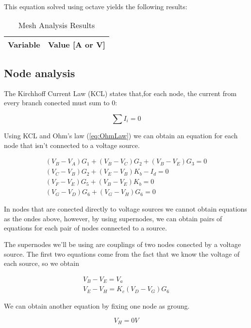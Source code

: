 This equation solved using octave yields the following results:

\begin{table}[H]
    \centering
    \begin{tabular}{|l|r|}
      \hline    
      {\bf Variable} & {\bf Value [A or V]} \\ \hline
      
    \end{tabular}
    \caption{Mesh Analysis Results}
    \label{tab:meshA}
  \end{table}

\subsection{Node analysis}
The Kirchhoff Current Law (KCL) states that,for each node, the current from every branch conected must sum to 0:

\begin{equation}
  \sum I_i = 0
  \label{eq:KCL}
\end{equation}


Using KCL and Ohm's law (\ref{eq:OhmLaw}) we can obtain an equation for each node that isn't connected to a voltage source.

\begin{align}
  (V_B-V_A)G_1+(V_B-V_C)G_2+(V_B-V_E)G_3=0\\
  (V_C-V_B)G_2+(V_E-V_B)K_b-I_d=0\\
  (V_F-V_E)G_5+(V_B-V_E)K_b=0\\
  (V_G-V_D)G_6+(V_G-V_H)G_6=0
  \label{eq:nodos}
\end{align}


In nodes that are conected directly to voltage sources we cannot obtain equations as the ondes above, however, by using supernodes, we can obtain pairs of equations for each pair of nodes connected to a source.
\par
The supernodes we'll be using are couplings of two nodes conected by a voltage source. The first two equations come from the fact that we know the voltage of each source, so we obtain

 \begin{align}
  V_B-V_E=V_a\\
  V_E-V_H=K_c(V_D-V_G)G_6
  \label{eq:supenodosV}
\end{align}

We can obtain another equation by fixing one node as groung.

 \begin{equation}
  V_H = 0V
  \label{eq:supenodosGND}
\end{equation}

